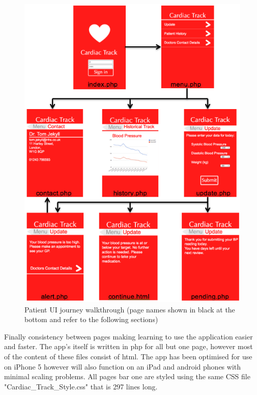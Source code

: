 \documentclass[11pt]{article}
\begin{document}
\begin{figure}
\centering
\includegraphics[width=1\linewidth]{patientUI.png}
\caption{Patient UI journey walkthrough (page names shown in black at the bottom and refer to the following sections) \label{patientUI}}
\end{figure} 
Finally consistency between pages making learning to use the application easier and faster. The app's itself is written in php for all but one page, however most of the content of these files consist of html. The app has been optimised for use on iPhone 5 however will also function on an iPad and android phones with minimal scaling problems. All pages bar one are styled using the same CSS file "Cardiac\_Track\_Style.css" that is 297 lines long. 
\end{document}
